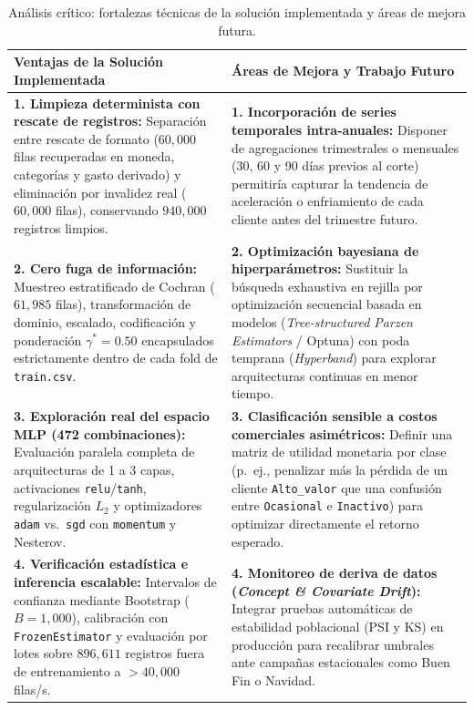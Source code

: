 \documentclass[11pt,a4paper]{article}
\newcommand{\code}[1]{\texttt{\small #1}}
\begin{document}
\begin{table}[H]
\centering
\caption{Análisis crítico: fortalezas técnicas de la solución implementada y áreas de mejora futura.}
\small
\begin{tabularx}{\textwidth}{>{\raggedright\arraybackslash}X >{\raggedright\arraybackslash}X}
\toprule
\textbf{\textcolor{buapnavy}{Ventajas de la Solución Implementada}} & \textbf{\textcolor{fccblue}{Áreas de Mejora y Trabajo Futuro}} \\
\midrule
\textbf{1. Limpieza determinista con rescate de registros:} Separación entre rescate de formato ($60{,}000$ filas recuperadas en moneda, categorías y gasto derivado) y eliminación por invalidez real ($60{,}000$ filas), conservando $940{,}000$ registros limpios. & \textbf{1. Incorporación de series temporales intra-anuales:} Disponer de agregaciones trimestrales o mensuales (30, 60 y 90 días previos al corte) permitiría capturar la tendencia de aceleración o enfriamiento de cada cliente antes del trimestre futuro. \\
\addlinespace[4pt]
\textbf{2. Cero fuga de información:} Muestreo estratificado de Cochran ($61{,}985$ filas), transformación de dominio, escalado, codificación y ponderación $\gamma^* = 0.50$ encapsulados estrictamente dentro de cada fold de \code{train.csv}. & \textbf{2. Optimización bayesiana de hiperparámetros:} Sustituir la búsqueda exhaustiva en rejilla por optimización secuencial basada en modelos (\textit{Tree-structured Parzen Estimators} / Optuna) con poda temprana (\textit{Hyperband}) para explorar arquitecturas continuas en menor tiempo. \\
\addlinespace[4pt]
\textbf{3. Exploración real del espacio MLP (472 combinaciones):} Evaluación paralela completa de arquitecturas de 1 a 3 capas, activaciones \code{relu}/\code{tanh}, regularización $L_2$ y optimizadores \code{adam} vs.\ \code{sgd} con \code{momentum} y Nesterov. & \textbf{3. Clasificación sensible a costos comerciales asimétricos:} Definir una matriz de utilidad monetaria por clase (p.\ ej., penalizar más la pérdida de un cliente \code{Alto\_valor} que una confusión entre \code{Ocasional} e \code{Inactivo}) para optimizar directamente el retorno esperado. \\
\addlinespace[4pt]
\textbf{4. Verificación estadística e inferencia escalable:} Intervalos de confianza mediante Bootstrap ($B=1{,}000$), calibración con \code{FrozenEstimator} y evaluación por lotes sobre $896{,}611$ registros fuera de entrenamiento a $>40{,}000$ filas/s. & \textbf{4. Monitoreo de deriva de datos (\textit{Concept \& Covariate Drift}):} Integrar pruebas automáticas de estabilidad poblacional (PSI y KS) en producción para recalibrar umbrales ante campañas estacionales como Buen Fin o Navidad. \\
\bottomrule
\end{tabularx}
\end{table}
\end{document}
